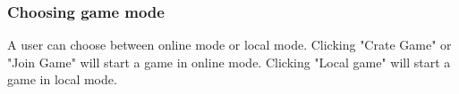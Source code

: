 \subsubsection{Choosing game mode}
A user can choose between online mode or local mode. Clicking "Crate Game" or "Join Game" will start a game in online mode. Clicking "Local game" will start a game in local mode.
\label{section:game_mode}
\begin{figure}[H]
	\centering
	\mbox{
	}	
\end{figure}

